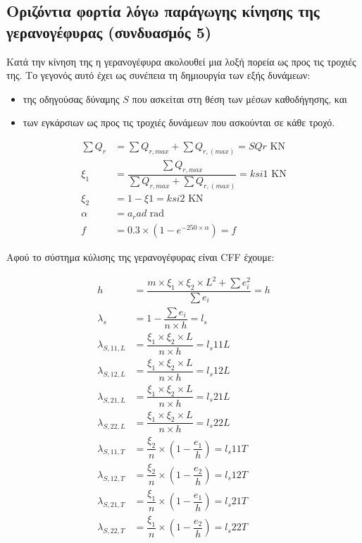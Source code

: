 
\subsection{Οριζόντια φορτία λόγω παράγωγης κίνησης της γερανογέφυρας (συνδυασμός 5)}

Κατά την κίνηση της η γερανογέφυρα ακολουθεί μια λοξή πορεία ως προς τις τροχιές της. Το γεγονός
αυτό έχει ως συνέπεια τη δημιουργία των εξής δυνάμεων:

\begin{itemize}
    \item της οδηγούσας δύναμης $S$ που ασκείται στη θέση των μέσων καθοδήγησης, και
    \item των εγκάρσιων ως προς τις τροχιές δυνάμεων που ασκούνται σε κάθε τροχό.
\end{itemize}

\begin{align*}
    \sum{Q_r}   &= \displaystyle\sum{Q_{r,max}} + \displaystyle\sum{Q_{r,(max)}} = {{ SQr }} \text{ KN} \\
    \xi_1       &= \dfrac{\displaystyle\sum{Q_{r,max}}}{\displaystyle\sum{Q_{r,max}} + \displaystyle\sum{Q_{r,(max)}}} = {{ ksi1 }} \text{ KN} \\
    \xi_2       &= 1 - \xi1 = {{ ksi2 }} \text{ KN} \\
    \alpha      &= {{ a_rad }} \text{ rad} \\
    f           &= 0.3 \times \left(1 - e^{-250 \times \alpha}\right) = {{ f }}
\end{align*}

Αφού το σύστημα κύλισης της γερανογέφυρας είναι CFF έχουμε:

\begin{align*}
    h                &= \dfrac{m \times \xi_1 \times \xi_2 \times L^2 + \sum{e_i^2}}{\sum{e_i}} = {{ h }} \\
    \lambda_s        &= 1 - \dfrac{\sum{e_i}}{n \times h} =  {{ l_s }} \\
    \lambda_{S,11,L} &= \dfrac{\xi_1 \times \xi_2 \times L}{n \times h}= {{ l_s11L }} \\
    \lambda_{S,12,L} &= \dfrac{\xi_1 \times \xi_2 \times L}{n \times h}= {{ l_s12L }} \\
    \lambda_{S,21,L} &= \dfrac{\xi_1 \times \xi_2 \times L}{n \times h}= {{ l_s21L }} \\
    \lambda_{S,22,L} &= \dfrac{\xi_1 \times \xi_2 \times L}{n \times h}= {{ l_s22L }} \\
    \lambda_{S,11,T} &= \dfrac{\xi_2}{n} \times \left(1 - \dfrac{e_1}{h}\right) = {{ l_s11T }} \\
    \lambda_{S,12,T} &= \dfrac{\xi_2}{n} \times \left(1 - \dfrac{e_2}{h}\right) = {{ l_s12T }} \\
    \lambda_{S,21,T} &= \dfrac{\xi_1}{n} \times \left(1 - \dfrac{e_1}{h}\right) = {{ l_s21T }} \\
    \lambda_{S,22,T} &= \dfrac{\xi_1}{n} \times \left(1 - \dfrac{e_2}{h}\right) = {{ l_s22T }}
\end{align*}

